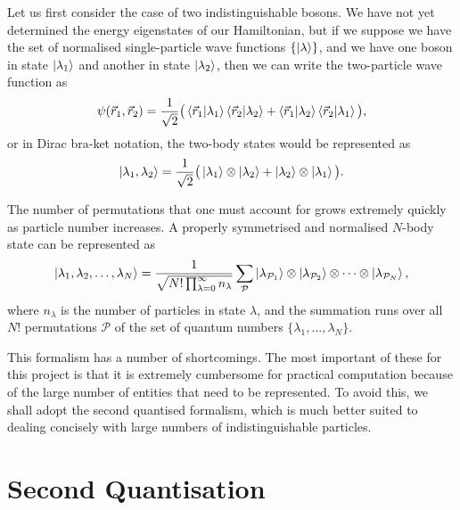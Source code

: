 \documentclass[a4paper,10pt]{article}
\theoremstyle{plain}
\begin{document}
Let us first consider the case of two indistinguishable bosons. We have not yet
determined the energy eigenstates of our Hamiltonian, but if we suppose we have
the set of normalised single-particle wave functions $\lbrace \ket{\lambda}
\rbrace$, and we have one boson in state $\ket{\lambda_1}$ and another in state
$\ket{\lambda_2}$, then we can write the two-particle wave function as
\begin{equation}
    \psi(\vec{r}_{1},\vec{r}_{2})
    =
    \frac{1}{\sqrt{2}}
    \big (
        \braket{\vec{r}_{1} | \lambda_1} \braket{\vec{r}_{2} | \lambda_2} +
        \braket{\vec{r}_{1} | \lambda_2} \braket{\vec{r}_{2} | \lambda_1}
    \big ),
\end{equation}
or in Dirac bra-ket notation, the two-body states would be represented as
\begin{equation}
    \ket{\lambda_1, \lambda_2}
    =
    \frac{1}{\sqrt{2}}
    \big (
        \ket{\lambda_1} \otimes \ket{\lambda_2} +
        \ket{\lambda_2} \otimes \ket{\lambda_1}
    \big ).
\end{equation}

The number of permutations that one must account for grows extremely quickly as
particle number increases. A properly symmetrised and normalised $N$-body state
can be represented \cite{Altland2010} as
\begin{equation}
    \ket{\lambda_{1}, \lambda_{2}, \dots, \lambda_{N}}
    =
    \frac{1}{\sqrt{N! \prod_{\lambda = 0}^{\infty}{n_{\lambda}}}}
    \sum_{\mathcal{P}}
        \ket{\lambda_{\mathcal{P}_{1}}} \otimes
        \ket{\lambda_{\mathcal{P}_{2}}} \otimes
        \dots                         \otimes
        \ket{\lambda_{\mathcal{P}_{N}}},
\end{equation}
where $n_{\lambda}$ is the number of particles in state $\lambda$, and the
summation runs over all $N!$ permutations $\mathcal{P}$ of the set of quantum
numbers $\lbrace \lambda_{1}, \dots, \lambda_{N} \rbrace$.

This formalism has a number of shortcomings. The most important of these for
this project is that it is extremely cumbersome for practical computation
because of the large number of entities that need to be represented. To avoid
this, we shall adopt the second quantised formalism, which is much better suited
to dealing concisely with large numbers of indistinguishable particles.
\newpage


\section{Second Quantisation}
\end{document}

